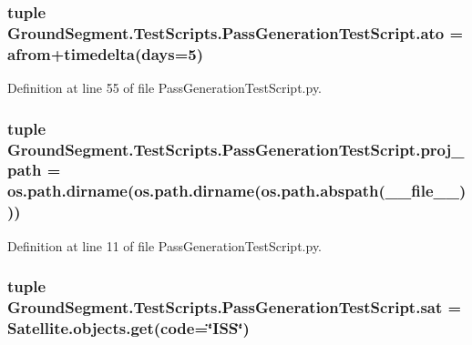 \subsubsection[{ato}]{\setlength{\rightskip}{0pt plus 5cm}tuple Ground\+Segment.\+Test\+Scripts.\+Pass\+Generation\+Test\+Script.\+ato = {\bf afrom}+timedelta(days=5)}\label{namespace_ground_segment_1_1_test_scripts_1_1_pass_generation_test_script_a1450da5336c8a08475cd8ca3f6d51448}


Definition at line 55 of file Pass\+Generation\+Test\+Script.\+py.

\hypertarget{namespace_ground_segment_1_1_test_scripts_1_1_pass_generation_test_script_aa6ec52465e707ade08450ea276edbaa2}{}
\subsubsection[{proj\+\_\+path}]{\setlength{\rightskip}{0pt plus 5cm}tuple Ground\+Segment.\+Test\+Scripts.\+Pass\+Generation\+Test\+Script.\+proj\+\_\+path = os.\+path.\+dirname(os.\+path.\+dirname(os.\+path.\+abspath(\+\_\+\+\_\+file\+\_\+\+\_\+)))}\label{namespace_ground_segment_1_1_test_scripts_1_1_pass_generation_test_script_aa6ec52465e707ade08450ea276edbaa2}


Definition at line 11 of file Pass\+Generation\+Test\+Script.\+py.

\hypertarget{namespace_ground_segment_1_1_test_scripts_1_1_pass_generation_test_script_ad1929734660184b683fd73c95d4a0fe4}{}
\subsubsection[{sat}]{\setlength{\rightskip}{0pt plus 5cm}tuple Ground\+Segment.\+Test\+Scripts.\+Pass\+Generation\+Test\+Script.\+sat = Satellite.\+objects.\+get(code=\char`\"{}I\+S\+S\char`\"{})}\label{namespace_ground_segment_1_1_test_scripts_1_1_pass_generation_test_script_ad1929734660184b683fd73c95d4a0fe4}


